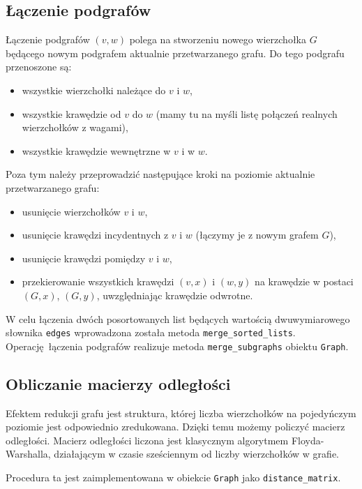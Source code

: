 \documentclass[a4paper,10pt]{article}
\begin{document}
\subsection{Łączenie podgrafów}

Łączenie podgrafów $(v, w)$ polega na stworzeniu nowego wierzchołka $G$ będącego nowym podgrafem aktualnie przetwarzanego grafu. Do tego podgrafu przenoszone są:
\begin{itemize}
 \item wszystkie wierzchołki należące do $v$ i $w$,
 \item wszystkie krawędzie od $v$ do $w$ (mamy tu na myśli listę połączeń realnych wierzchołków z wagami),
 \item wszystkie krawędzie wewnętrzne w $v$ i w $w$.
\end{itemize}

Poza tym należy przeprowadzić następujące kroki na poziomie aktualnie przetwarzanego grafu:

\begin{itemize}
 \item usunięcie wierzchołków $v$ i $w$,
 \item usunięcie krawędzi incydentnych z $v$ i $w$ (łączymy je z nowym grafem $G$),
 \item usunięcie krawędzi pomiędzy $v$ i $w$,
 \item przekierowanie wszystkich krawędzi $\left(v, x\right)$ i $\left(w, y\right)$ na krawędzie w postaci $\left(G, x\right)$, $\left(G, y\right)$, uwzględniając krawędzie odwrotne.
\end{itemize}

W celu łączenia dwóch posortowanych list będących wartością dwuwymiarowego słownika \texttt{edges} wprowadzona została metoda \texttt{merge\_sorted\_lists}. Operację łączenia podgrafów realizuje metoda \texttt{merge\_subgraphs} obiektu \texttt{Graph}.

\subsection{Obliczanie macierzy odległości}

Efektem redukcji grafu jest struktura, której liczba wierzchołków na pojedyńczym poziomie jest odpowiednio zredukowana. Dzięki temu możemy policzyć macierz odległości. Macierz odległości liczona jest klasycznym algorytmem Floyda-Warshalla, działającym w czasie sześciennym od liczby wierzchołków w grafie.

Procedura ta jest zaimplementowana w obiekcie \texttt{Graph} jako \texttt{distance\_matrix}.
\end{document}
